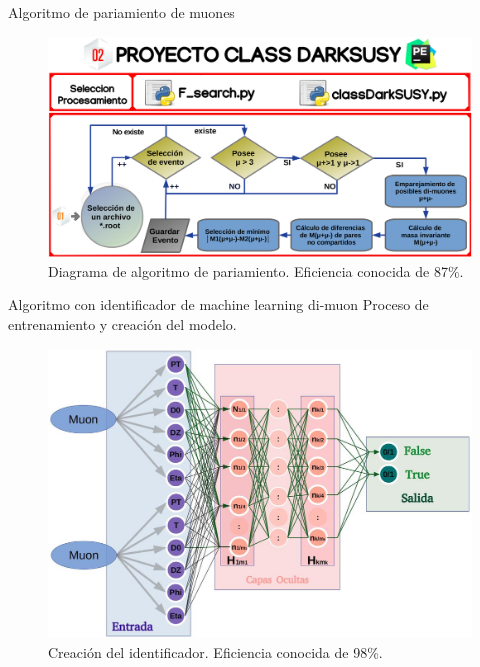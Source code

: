\begin{frame}{Algoritmo de pariamiento de muones}
\begin{figure}[h]
\centering
\includegraphics[width=1\textwidth]{Imag/class_darksusy.png}
\caption{Diagrama de algoritmo de pariamiento. Eficiencia conocida de 87\%.}
\end{figure}   
\end{frame}


\begin{frame}{Algoritmo con identificador de machine learning di-muon}
Proceso de entrenamiento y creaci\'on del modelo.
\begin{figure}[h]
\centering
\includegraphics[width=.8\textwidth]{Imag/IDENTIFICADOR.png}
\caption{Creaci\'on del identificador. Eficiencia conocida de 98\%.}
\end{figure}   
\end{frame}


